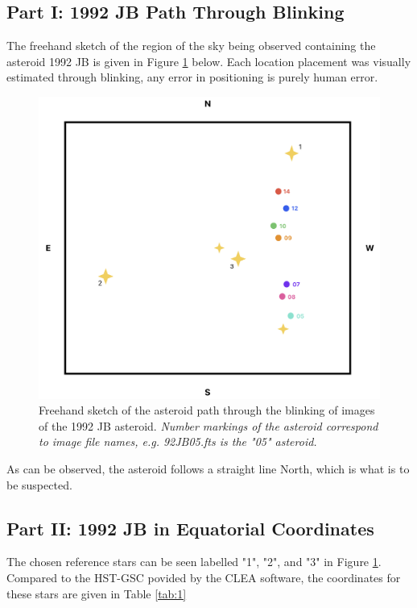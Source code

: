 \documentclass[12pt]{article}
\begin{document}
\subsection{Part I: 1992 JB Path Through Blinking}

The freehand sketch of the region of the sky being observed containing the asteroid 1992 JB is given in Figure \ref{fig:4} below. Each location placement was visually estimated through blinking, any error in positioning is purely human error.

\begin{figure}[H]
    \centering
    \includegraphics[width=.8\textwidth]{freehand asteroid.png}
    \caption{Freehand sketch of the asteroid path through the blinking of images of the 1992 JB asteroid. \newline \textit{Number markings of the asteroid correspond to image file names, e.g. 92JB05.fts is the "05" asteroid.}}
    \label{fig:4}
\end{figure}

As can be observed, the asteroid follows a straight line North, which is what is to be suspected.

\subsection{Part II: 1992 JB in Equatorial Coordinates}

The chosen reference stars can be seen labelled "1", "2", and "3" in Figure \ref{fig:4}. Compared to the HST-GSC povided by the CLEA software, the coordinates for these stars are given in Table \ref{tab:1}
\end{document}

